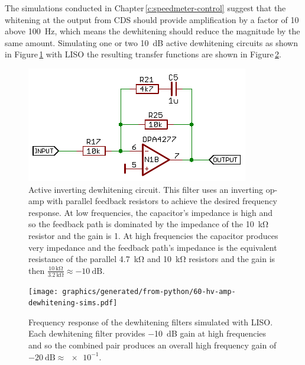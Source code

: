 The simulations conducted in Chapter\,\ref{c:speedmeter-control} suggest that the whitening at the output from \gls{CDS} should provide amplification by a factor of \num{10} above \SI{100}{\hertz}, which means the dewhitening should reduce the magnitude by the same amount. Simulating one or two \SI{10}{\deci\bel} active dewhitening circuits as shown in Figure\,\ref{fig:hv-amp-dewhitening-circuit} with \gls{LISO} the resulting transfer functions are shown in Figure\,\ref{fig:hv-amp-dewhitening-sims}.

\begin{figure}
  \centering
  \includegraphics[width=\columnwidth]{graphics/60-hv-amp-dewhitening.pdf}
  \caption[Active inverting dewhitening circuit]{Active inverting dewhitening circuit. This filter uses an inverting op-amp with parallel feedback resistors to achieve the desired frequency response. At low frequencies, the capacitor's impedance is high and so the feedback path is dominated by the impedance of the \SI{10}{\kilo\ohm} resistor and the gain is \num{1}. At high frequencies the capacitor produces very impedance and the feedback path's impedance is the equivalent resistance of the parallel \SI{4.7}{\kilo\ohm} and \SI{10}{\kilo\ohm} resistors and the gain is then $\frac{\SI{10}{\kilo\ohm}}{\SI{3.2}{\kilo\ohm}} \approx \SI{-10}{\deci\bel}$.}
  \label{fig:hv-amp-dewhitening-circuit}
\end{figure}

\begin{figure}
  \centering
  \texttt{[image: graphics/generated/from-python/60-hv-amp-dewhitening-sims.pdf]}
  \caption[Simulated dewhitening filter frequency response]{Frequency response of the dewhitening filters simulated with \gls{LISO}. Each dewhitening filter provides \SI{-10}{\deci\bel} gain at high frequencies and so the combined pair produces an overall high frequency gain of $\SI{-20}{\deci\bel} \approx \num{e-1}$.}
  \label{fig:hv-amp-dewhitening-sims}
\end{figure}

